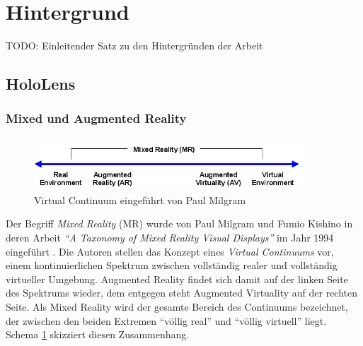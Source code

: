 \section{Hintergrund}
\label{sec-2}

TODO: Einleitender Satz zu den Hintergründen der Arbeit

\subsection{HoloLens}
\label{sec-2-1}

\subsubsection{Mixed und Augmented Reality}
\label{sec-2-1-1}

\begin{figure}[h!]
	\centering
	\includegraphics[width=0.9\textwidth]{images/papers/virtual_continuum.png}
	\caption{Virtual Continuum eingeführt von Paul Milgram \cite{Milgram94}}
	\label{img:virtual_continuum}
\end{figure}

Der Begriff \textit{Mixed Reality} (MR) wurde von Paul Milgram und Fumio Kishino in deren Arbeit \textit{``A Taxonomy of Mixed Reality Visual Displays''} im Jahr 1994 eingeführt \cite{Milgram94}. Die Autoren stellen das Konzept eines \textit{Virtual Continuums} vor, einem kontinuierlichen Spektrum zwischen vollständig realer und vollständig virtueller Umgebung. Augmented Reality findet sich damit auf der linken Seite des Spektrums wieder, dem entgegen steht Augmented Virtuality auf der rechten Seite. Als Mixed Reality wird der gesamte Bereich des Continuums bezeichnet, der zwischen den beiden Extremen ``völlig real'' und ``völlig virtuell'' liegt. Schema \ref{img:virtual_continuum} skizziert diesen Zusammenhang.\\

